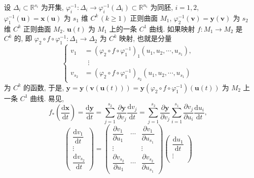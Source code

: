 \begin{definition}\label{def:9.1.3}
设 $\Delta_{i} \subset \mathbb{R}^{s_{i}}$ 为开集, $\varphi_{i}^{-1}\colon \Delta_{i} \to \varphi_{i}^{-1}(\Delta_{i}) \subset \mathbb{R}^{n_{i}}$ 为同胚, $i = 1, 2$, $\varphi_{1}^{-1}(\boldsymbol{u}) = \boldsymbol{x}(\boldsymbol{u})$ 为 $s_{1}$ 维 $C^{k}\,(k \geqslant 1)$ 正则曲面 $M_{1}$, $\varphi_{2}^{-1}(\boldsymbol{v}) = \boldsymbol{y}(\boldsymbol{v})$ 为 $s_{2}$ 维 $C^{k}$ 正则曲面 $M_{2}$. $\boldsymbol{u}(t)$ 为 $M_{1}$ 上的一条 $C^{1}$ 曲线. 如果映射 $f\colon M_{1} \to M_{2}$ 是 $C^{k}$ 的, 即 $\varphi_{2} \circ f \circ \varphi_{1}^{-1}\colon \Delta_{1} \to \Delta_{2}$ 为 $C^{k}$ 映射, 也就是分量
\[
  \left\{\begin{aligned}
    v_{1} &= (\varphi_{2} \circ f \circ \varphi_{1}^{-1})_{1}(u_{1}, u_{2}, \cdots, u_{s_{1}}), \\
    &\;\;\vdots \\
    v_{s_{2}} &= (\varphi_{2} \circ f \circ \varphi_{1}^{-1})_{s_{2}}(u_{1}, u_{2}, \cdots, u_{s_{1}})
  \end{aligned}\right.
\]
为 $C^{k}$ 的函数, 于是, $\boldsymbol{y} = \boldsymbol{y}(\boldsymbol{v}(\boldsymbol{u}(t))) = \boldsymbol{y}(\varphi_{2} \circ f \circ \varphi_{1}^{-1})(\boldsymbol{u}(t))$ 为 $M_{2}$ 上一条 $C^{1}$ 曲线. 易见,
\[
  f_{*}\left(\frac{\mathrm{d}\boldsymbol{x}}{\mathrm{d}t}\right) = \frac{\mathrm{d}\boldsymbol{y}}{\mathrm{d}t} = \sum_{j=1}^{s_{2}}\frac{\partial\boldsymbol{y}}{\partial v_{j}}\frac{\mathrm{d}v_{j}}{\mathrm{d}t} = \sum_{j=1}^{s_{2}}\frac{\partial\boldsymbol{y}}{\partial v_{j}}\sum_{i=1}^{s_{1}}\frac{\partial v_{j}}{\partial u_{i}}\frac{\mathrm{d}u_{i}}{\mathrm{d}t},
\]
\[
  \begin{pmatrix}
    \dfrac{\mathrm{d}v_{1}}{\mathrm{d}t} \\
    \vdots \\
    \dfrac{\mathrm{d}v_{s_{2}}}{\mathrm{d}t}
  \end{pmatrix} = \begin{pmatrix}
    \dfrac{\partial v_{1}}{\partial u_{1}} & \cdots & \dfrac{\partial v_{1}}{\partial u_{s_{1}}} \\
    \vdots & & \vdots \\
    \dfrac{\partial v_{s_{2}}}{\partial u_{1}} & \cdots & \dfrac{\partial v_{s_{2}}}{\partial u_{s_{1}}}
  \end{pmatrix}\begin{pmatrix}
    \dfrac{\mathrm{d}u_{1}}{\mathrm{d}t} \\
    \vdots \\

\end{pmatrix}\]
\end{definition}
